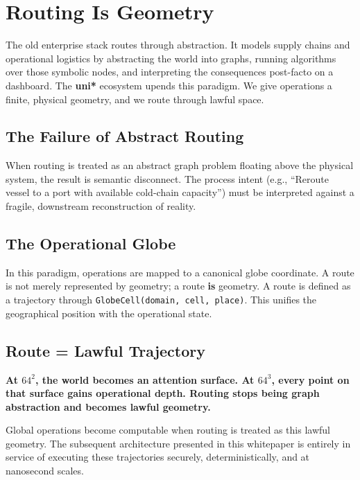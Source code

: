 \chapter{Routing Is Geometry}

The old enterprise stack routes through abstraction. It models supply chains and operational logistics by abstracting the world into graphs, running algorithms over those symbolic nodes, and interpreting the consequences post-facto on a dashboard. The \textbf{uni*} ecosystem upends this paradigm. We give operations a finite, physical geometry, and we route through lawful space.

\section{The Failure of Abstract Routing}

When routing is treated as an abstract graph problem floating above the physical system, the result is semantic disconnect. The process intent (e.g., ``Reroute vessel to a port with available cold-chain capacity'') must be interpreted against a fragile, downstream reconstruction of reality. 

\section{The Operational Globe}

In this paradigm, operations are mapped to a canonical globe coordinate. A route is not merely represented by geometry; a route \textbf{is} geometry. A route is defined as a trajectory through \texttt{GlobeCell(domain, cell, place)}. This unifies the geographical position with the operational state. 

\section{Route = Lawful Trajectory}

\textbf{At $64^2$, the world becomes an attention surface. At $64^3$, every point on that surface gains operational depth. Routing stops being graph abstraction and becomes lawful geometry.}

Global operations become computable when routing is treated as this lawful geometry. The subsequent architecture presented in this whitepaper is entirely in service of executing these trajectories securely, deterministically, and at nanosecond scales.